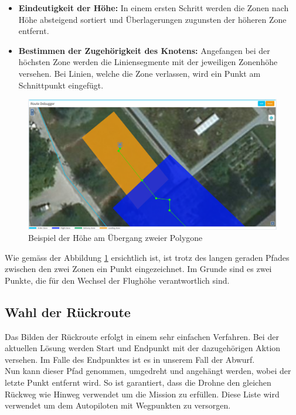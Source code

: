 \begin{itemize}
	\item{\textbf{Eindeutigkeit der Höhe:} In einem ersten Schritt werden die Zonen nach Höhe absteigend sortiert und Überlagerungen zugunsten der höheren Zone entfernt.}
	\item{\textbf{Bestimmen der Zugehörigkeit des Knotens:} Angefangen bei der höchsten Zone werden die Liniensegmente mit der jeweiligen Zonenhöhe versehen. Bei Linien, welche die Zone verlassen, wird ein Punkt am Schnittpunkt eingefügt.}
\end{itemize}
\begin{figure}[h]
	\centering
	\includegraphics[width=1.0\textwidth]{images/routing/height_example.png}
	\caption{Beispiel der Höhe am Übergang zweier Polygone}
	\label{fig:polygon-border-example}
\end{figure}
Wie gemäss der Abbildung \ref{fig:polygon-border-example} ersichtlich ist, ist trotz des langen geraden Pfades zwischen den zwei Zonen ein Punkt eingezeichnet. Im Grunde sind es zwei Punkte, die für den Wechsel der Flughöhe verantwortlich sind.
\newpage
\subsection{Wahl der Rückroute}
Das Bilden der Rückroute erfolgt in einem sehr einfachen Verfahren. Bei der aktuellen Lösung werden Start und Endpunkt mit der dazugehörigen Aktion versehen. Im Falle des Endpunktes ist es in unserem Fall der Abwurf.
\\
Nun kann dieser Pfad genommen, umgedreht und angehängt werden, wobei der letzte Punkt entfernt wird. So ist garantiert, dass die Drohne den gleichen Rückweg wie Hinweg verwendet um die Mission zu erfüllen. Diese Liste wird verwendet um dem Autopiloten mit Wegpunkten zu versorgen.
